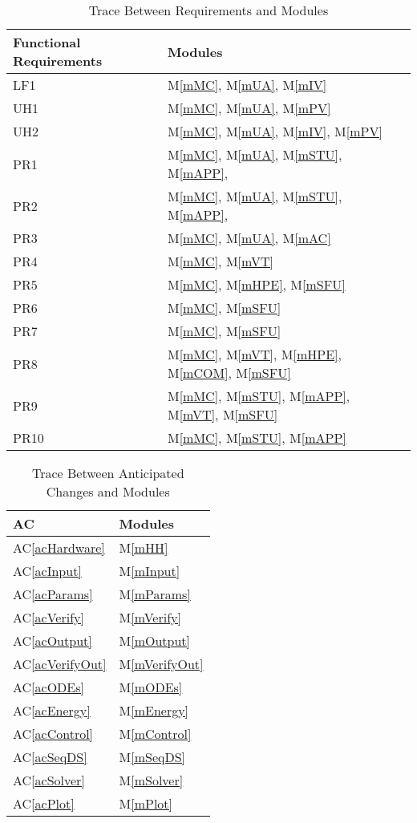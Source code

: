\documentclass[12pt, titlepage]{article}
\newcommand{\acref}[1]{AC\ref{#1}}
\newcommand{\mref}[1]{M\ref{#1}}
\begin{document}
\begin{table}[H]
\centering
\begin{tabular}{p{} p{}}
\toprule
\textbf{Functional Requirements} & \textbf{Modules}\\
\midrule
LF1 & \mref{mMC}, \mref{mUA}, \mref{mIV}\\
UH1 & \mref{mMC}, \mref{mUA}, \mref{mPV}\\
UH2 & \mref{mMC}, \mref{mUA}, \mref{mIV}, \mref{mPV}\\
PR1 & \mref{mMC}, \mref{mUA}, \mref{mSTU}, \mref{mAPP},\\
PR2 & \mref{mMC}, \mref{mUA}, \mref{mSTU}, \mref{mAPP},\\
PR3 & \mref{mMC}, \mref{mUA}, \mref{mAC}\\
PR4 & \mref{mMC}, \mref{mVT}\\
PR5 & \mref{mMC}, \mref{mHPE}, \mref{mSFU}\\
PR6 & \mref{mMC}, \mref{mSFU}\\
PR7 & \mref{mMC}, \mref{mSFU}\\
PR8 & \mref{mMC}, \mref{mVT}, \mref{mHPE}, \mref{mCOM}, \mref{mSFU}\\
PR9 & \mref{mMC}, \mref{mSTU}, \mref{mAPP}, \mref{mVT}, \mref{mSFU}\\
PR10 & \mref{mMC}, \mref{mSTU}, \mref{mAPP}\\
\bottomrule
\end{tabular}
\caption{Trace Between Requirements and Modules}
\label{TblRT}
\end{table}

\begin{table}[H]
\centering
\begin{tabular}{p{} p{}}
\toprule
\textbf{AC} & \textbf{Modules}\\
\midrule
\acref{acHardware} & \mref{mHH}\\
\acref{acInput} & \mref{mInput}\\
\acref{acParams} & \mref{mParams}\\
\acref{acVerify} & \mref{mVerify}\\
\acref{acOutput} & \mref{mOutput}\\
\acref{acVerifyOut} & \mref{mVerifyOut}\\
\acref{acODEs} & \mref{mODEs}\\
\acref{acEnergy} & \mref{mEnergy}\\
\acref{acControl} & \mref{mControl}\\
\acref{acSeqDS} & \mref{mSeqDS}\\
\acref{acSolver} & \mref{mSolver}\\
\acref{acPlot} & \mref{mPlot}\\
\bottomrule
\end{tabular}
\caption{Trace Between Anticipated Changes and Modules}
\label{TblACT}
\end{table}
\end{document}
